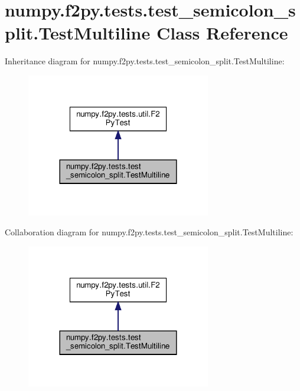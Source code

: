 \hypertarget{classnumpy_1_1f2py_1_1tests_1_1test__semicolon__split_1_1TestMultiline}{}\section{numpy.\+f2py.\+tests.\+test\+\_\+semicolon\+\_\+split.\+Test\+Multiline Class Reference}
\label{classnumpy_1_1f2py_1_1tests_1_1test__semicolon__split_1_1TestMultiline}


Inheritance diagram for numpy.\+f2py.\+tests.\+test\+\_\+semicolon\+\_\+split.\+Test\+Multiline\+:
\nopagebreak
\begin{figure}[H]
\begin{center}
\leavevmode
\includegraphics[width=228pt]{classnumpy_1_1f2py_1_1tests_1_1test__semicolon__split_1_1TestMultiline__inherit__graph}
\end{center}
\end{figure}


Collaboration diagram for numpy.\+f2py.\+tests.\+test\+\_\+semicolon\+\_\+split.\+Test\+Multiline\+:
\nopagebreak
\begin{figure}[H]
\begin{center}
\leavevmode
\includegraphics[width=228pt]{classnumpy_1_1f2py_1_1tests_1_1test__semicolon__split_1_1TestMultiline__coll__graph}
\end{center}
\end{figure}
